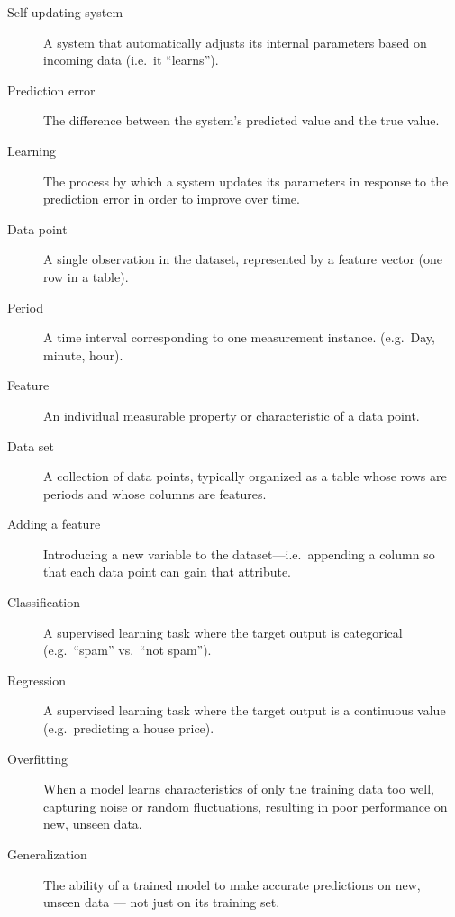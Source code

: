 \documentclass[a4paper,12pt]{report}
\begin{document}
\begin{description}
  \item[Self‑updating system] A system that automatically adjusts its internal parameters based on incoming data (i.e.\ it “learns”).

  \item[Prediction error] The difference between the system’s predicted value and the true value.

  \item[Learning] The process by which a system updates its parameters in response to the prediction error in order to improve over time.

  \item[Data point] A single observation in the dataset, represented by a feature vector (one row in a table).

  \item[Period] A time interval corresponding to one measurement instance. (e.g.\ Day, minute, hour).

  \item[Feature] An individual measurable property or characteristic of a data point.

  \item[Data set] A collection of data points, typically organized as a table whose rows are periods and whose columns are features.

  \item[Adding a feature] Introducing a new variable to the dataset—i.e.\ appending a column so that each data point can gain that attribute.

  \item[Classification] A supervised learning task where the target output is categorical (e.g.\ “spam” vs.\ “not spam”).

  \item[Regression] A supervised learning task where the target output is a continuous value (e.g.\ predicting a house price).

  \item[Overfitting] When a model learns characteristics of only the training data too well, capturing noise or random fluctuations, resulting in poor performance on new, unseen data.

  \item[Generalization] The ability of a trained model to make accurate predictions on new, unseen data — not just on its training set.
\end{description}
\end{document}
